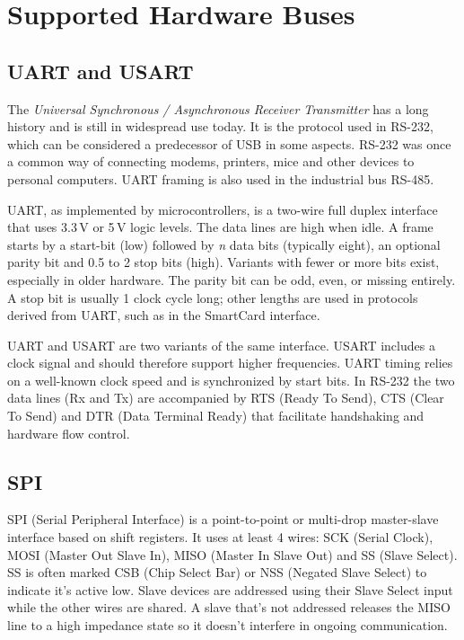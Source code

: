\chapter{Supported Hardware Buses}

\section{UART and USART}

The \textit{Universal Synchronous / Asynchronous Receiver Transmitter} has a long history and is still in widespread use today. It is the protocol used in RS-232, which can be considered a predecessor of USB in some aspects. RS-232 was once a common way of connecting modems, printers, mice and other devices to personal computers. UART framing is also used in the industrial bus RS-485.

UART, as implemented by microcontrollers, is a two-wire full duplex interface that uses 3.3\,V or 5\,V logic levels. The data lines are high when idle. A frame starts by a start-bit (low) followed by \textit{n} data bits (typically eight), an optional parity bit and 0.5 to 2 stop bits (high). Variants with fewer or more bits exist, especially in older hardware. The parity bit can be odd, even, or missing entirely. A stop bit is usually 1 clock cycle long; other lengths are used in protocols derived from UART, such as in the SmartCard interface. 


UART and USART are two variants of the same interface. USART includes a clock signal and should therefore support higher frequencies. UART timing relies on a well-known clock speed and is synchronized by start bits. In RS-232 the two data lines (Rx and Tx) are accompanied by RTS (Ready To Send), CTS (Clear To Send) and DTR (Data Terminal Ready) that facilitate handshaking and hardware flow control.


\section{SPI}

SPI (Serial Peripheral Interface) is a point-to-point or multi-drop master-slave interface based on shift registers. It uses at least 4 wires: SCK (Serial Clock), MOSI (Master Out Slave In), MISO (Master In Slave Out) and SS (Slave Select). SS is often marked CSB (Chip Select Bar) or NSS (Negated Slave Select) to indicate it's active low. Slave devices are addressed using their Slave Select input while the other wires are shared. A slave that's not addressed releases the MISO line to a high impedance state so it doesn't interfere in ongoing communication.

